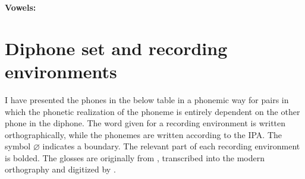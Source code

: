 \documentclass[12pt]{article}
\begin{document}
\begin{table*}[h]
\begin{threeparttable}
\begin{tabular}{|l|cc|cc|cc|cc|cc|cc|cc|cc|}
		\hline
		\end{tabular}
		\end{threeparttable}
		\end{table*}
		\noindent \textbf{Vowels:} \par
		\begin{vowel}
		\end{vowel}\par

\newpage

\section{Diphone set and recording environments}

	I have presented the phones in the below table in a phonemic way for pairs in which the phonetic realization of the phoneme is entirely dependent on the other phone in the diphone. The word given for a recording environment is written orthographically, while the phonemes are written according to the IPA. The symbol $\varnothing$ indicates a boundary. The relevant part of each recording environment is bolded. The glosses are originally from \citet{west_dict}, transcribed into the modern orthography and digitized by \citet{gov}. \par
\end{document}
